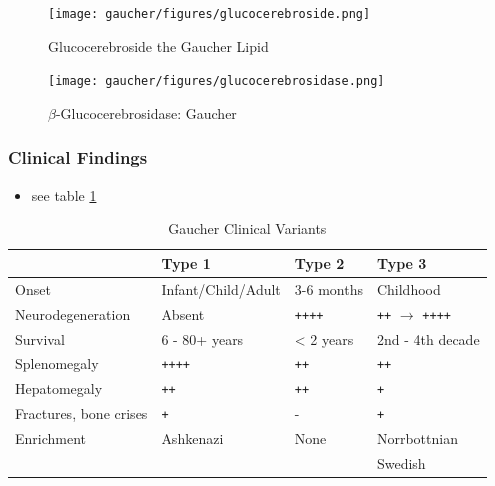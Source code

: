 \documentclass[12pt]{scrartcl}
\begin{document}
\begin{figure}[htbp]
\centering
\texttt{[image: gaucher/figures/glucocerebroside.png]}
\caption{\label{fig:org219790e}Glucocerebroside the Gaucher Lipid}
\end{figure}

\begin{figure}[htbp]
\centering
\texttt{[image: gaucher/figures/glucocerebrosidase.png]}
\caption{\label{fig:org5f96475}\(\beta\)-Glucocerebrosidase: Gaucher}
\end{figure}

\subsubsection{Clinical Findings}
\label{sec:orga39cb72}
\begin{itemize}
\item see table \ref{tab:orgcc1f4ff}
\end{itemize}

\begin{table}[htbp]
\caption{\label{tab:orgcc1f4ff}Gaucher Clinical Variants}
\centering
\begin{tabular}{llll}
 & Type 1 & Type 2 & Type 3\\
\hline
Onset & Infant/Child/Adult & 3-6 months & Childhood\\
Neurodegeneration & Absent & \texttt{++++} & \texttt{++} \(\to\) \texttt{++++}\\
Survival & 6 - 80+ years & < 2 years & 2nd - 4th decade\\
Splenomegaly & \texttt{++++} & \texttt{++} & \texttt{++}\\
Hepatomegaly & \texttt{++} & \texttt{++} & \texttt{+}\\
Fractures, bone crises & \texttt{+} & - & \texttt{+}\\
Enrichment & Ashkenazi & None & Norrbottnian\\
 &  &  & Swedish\\
\end{tabular}
\end{table}
\end{document}
